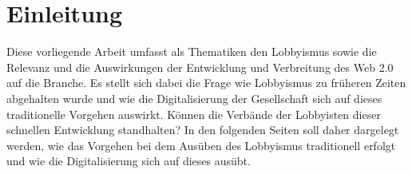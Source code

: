 \documentclass[12pt,a4paper,bibliography=totocnumbered,listof=totocnumbered]{scrartcl}
\begin{document}

\renewcommand{\sectionmark}[1]{\markright{#1}}
\renewcommand{\subsectionmark}[1]{}
\renewcommand{\subsubsectionmark}[1]{}
\rhead{\rightmark}

\onehalfspacing
\renewcommand{\thesection}{\arabic{section}}
\renewcommand{\theHsection}{\arabic{section}}
\setcounter{section}{0}
\setcounter{page}{1}

\section{Einleitung}
Diese vorliegende Arbeit umfasst als Thematiken den Lobbyismus sowie die Relevanz und die Auswirkungen der Entwicklung und Verbreitung des Web 2.0 auf die Branche. 
Es stellt sich dabei die Frage wie Lobbyismus zu früheren Zeiten abgehalten wurde und wie die Digitalisierung der Gesellschaft sich auf dieses traditionelle Vorgehen auswirkt. 
Können die Verbände der Lobbyisten dieser schnellen Entwicklung standhalten?  
In den folgenden Seiten soll daher dargelegt werden, wie das Vorgehen bei dem Ausüben des Lobbyismus traditionell erfolgt und wie die Digitalisierung sich auf dieses ausübt. 

\pagebreak

\end{document}
